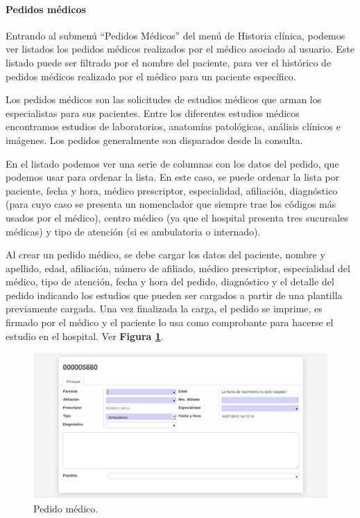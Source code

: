 \paragraph{Pedidos médicos}

Entrando al submenú ``Pedidos Médicos'' del menú de Historia clínica, podemos ver listados los pedidos médicos realizados por el médico asociado al usuario.
Este listado puede ser filtrado por el nombre del paciente, para ver el histórico de pedidos médicos realizado por el médico para un paciente específico.

Los pedidos médicos son las solicitudes de estudios médicos que arman los especialistas para sus pacientes.
Entre los diferentes estudios médicos encontramos estudios de laboratorios, anatomías patológicas, análisis clínicos e imágenes. Los pedidos generalmente son disparados desde la consulta.

En el listado podemos ver una serie de columnas con los datos del pedido, que podemos usar para ordenar la lista.
En este caso, se puede ordenar la lista por paciente, fecha y hora, médico prescriptor, especialidad, afiliación, diagnóstico (para cuyo caso se presenta un nomenclador que siempre trae los códigos más usados por el médico), centro médico (ya que el hospital presenta tres sucursales médicas) y tipo de atención (si es ambulatoria o internado).

Al crear un pedido médico, se debe cargar los datos del paciente, nombre y apellido, edad, afiliación, número de afiliado, médico prescriptor, especialidad del médico, tipo de atención, fecha y hora del pedido, diagnóstico y el detalle del pedido indicando los estudios que pueden ser cargados a partir de una plantilla previamente cargada. Una vez finalizada la carga, el pedido se imprime, es firmado por el médico y el paciente lo usa como comprobante para hacerse el estudio en el hospital. Ver \textbf{Figura \ref{pedido-medico}}.

\begin{figure}[h]
      \centering
      \includegraphics[width=.8\textwidth]{img/tp1/HE/PedidoMedico}
      \caption{Pedido médico.}
      \label{pedido-medico}
\end{figure}


